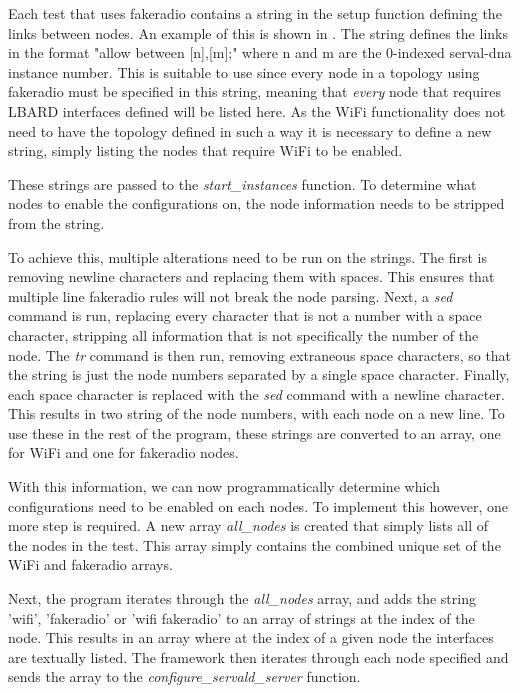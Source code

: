 Each test that uses fakeradio contains a string in the setup function defining the links between nodes.
An example of this is shown in . 
The string defines the links in the format "allow between [n],[m];" where n and m are the 0-indexed serval-dna instance number.
This is suitable to use since every node in a topology using fakeradio must be specified in this string, meaning that \emph{every} node that requires LBARD interfaces defined will be listed here.
As the WiFi functionality does not need to have the topology defined in such a way it is necessary to define a new string, simply listing the nodes that require WiFi to be enabled. 

These strings are passed to the \emph{start\_instances} function. 
To determine what nodes to enable the configurations on, the node information needs to be stripped from the string.

To achieve this, multiple alterations need to be run on the strings.
The first is removing newline characters and replacing them with spaces.
This ensures that multiple line fakeradio rules will not break the node parsing.
Next, a \emph{sed} command is run, replacing every character that is not a number with a space character, stripping all information that is not specifically the number of the node.
The \emph{tr} command is then run, removing extraneous space characters, so that the string is just the node numbers separated by a single space character.
Finally, each space character is replaced with the \emph{sed} command with a newline character.
This results in two string of the node numbers, with each node on a new line.
To use these in the rest of the program, these strings are converted to an array, one for WiFi and one for fakeradio nodes.

With this information, we can now programmatically determine which configurations need to be enabled on each nodes.
To implement this however, one more step is required.
A new array \emph{all\_nodes} is created that simply lists all of the nodes in the test.
This array simply contains the combined unique set of the WiFi and fakeradio arrays.

Next, the program iterates through the \emph{all\_nodes} array, and adds the string 'wifi', 'fakeradio' or 'wifi fakeradio' to an array of strings at the index of the node.
This results in an array where at the index of a given node the interfaces are textually listed.
The framework then iterates through each node specified and sends the array to the \emph{configure\_servald\_server} function.


